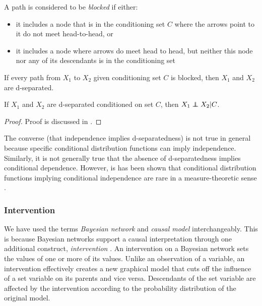 \documentclass[../thesis.tex]{subfiles}
\begin{document}
\begin{dfn}
A path is considered to be \emph{blocked} if either:
\begin{itemize}
\item it includes a node that is in the conditioning set \(C\) 
where the arrows point to it do not meet head-to-head, or
\item it includes a node where arrows do meet head to head, but
neither this node nor any of its descendants is in the
conditioning set
\end{itemize}
\end{dfn}

\begin{dfn}[D-separation]
If every path from \(X_1\) to \(X_2\) given conditioning set \(C\)
is blocked, then \(X_1\) and \(X_2\) are d-separated.
\end{dfn}

\begin{thm}\label{thm:d-seperated}
  If \(X_1\) and \(X_2\) are d-separated conditioned on set \(C\),
  then $X_1 \independent X_2 \vert C$.
\end{thm}

\begin{proof}
  Proof is discussed in \cite{koller2003multi}.
\end{proof}
\hfill
\hfill

The converse (that independence implies d-separatedness) is
not true in general because specific conditional distribution
functions can imply independence.
Similarly, it is not generally
true that the absence of d-separatedness implies conditional
dependence.
However, is has been shown that conditional distribution functions
implying conditional independence are rare
in a measure-theoretic sense
\cite{geiger1990logical,meek1995strong,koller2003multi}.

\subsubsection{Intervention}

We have used the terms \emph{Bayesian network} and
\emph{causal model} interchangeably.
This is because Bayesian networks support a causal
interpretation through one additional construct,
\emph{intervention} \cite{pearl1993bayesian}.
An intervention on a Bayesian network sets
the values of one or more of its values.
Unlike an observation of a variable,
an intervention effectively creates a new graphical
model that cuts off the
influence of a set variable on its parents and vice versa.
Descendants of the set variable are affected by
the intervention according to the probability
distribution of the original model.
\end{document}
